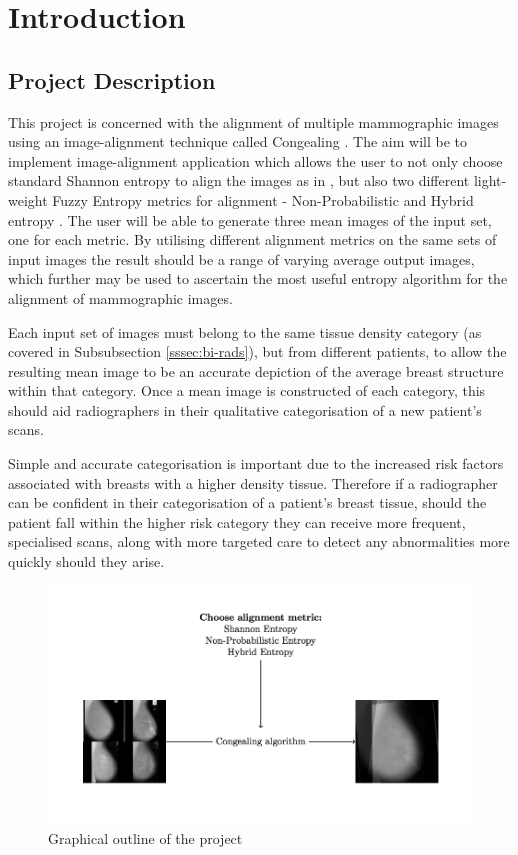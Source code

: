 \chapter{Introduction}

\section{Project Description}
This project is concerned with the alignment of multiple mammographic images using an image-alignment technique called \Gls{Congealing} \cite{joint-alignment}. The aim will be to implement image-alignment application which allows the user to not only choose standard Shannon entropy to align the images as in \cite{joint-alignment}, but also two different light-weight Fuzzy Entropy metrics for alignment - Non-Probabilistic \cite{DeLuca_Termini_1972} and Hybrid entropy \cite{Pal_Pal_1992}. The user will be able to generate three mean images of the input set, one for each metric. By utilising different alignment metrics on the same sets of input images the result should be a range of varying average output images, which further may be used to ascertain the most useful entropy algorithm for the alignment of mammographic images.

Each input set of images must belong to the same tissue density category (as covered in Subsubsection \ref{sssec:bi-rads}), but from different patients, to allow the resulting mean image to be an accurate depiction of the average breast structure within that category. Once a mean image is constructed of each category, this should aid radiographers in their qualitative categorisation of a new patient's scans.

Simple and accurate categorisation is important due to the increased risk factors associated with breasts with a higher density tissue. Therefore if a radiographer can be confident in their categorisation of a patient's breast tissue, should the patient fall within the higher risk category they can receive more frequent, specialised scans, along with more targeted care to detect any abnormalities more quickly should they arise.

\begin{figure}[H]
  \center
    \includegraphics{Introduction/diagram/diagram.png}
    \caption{Graphical outline of the project}
    \label{fig:project-desc-img}
\end{figure}



